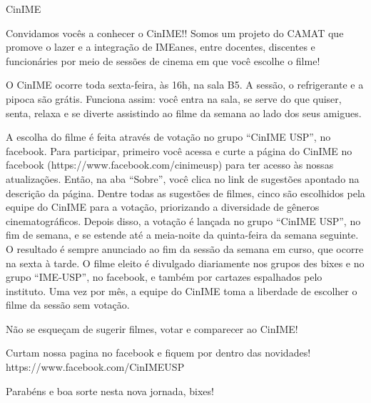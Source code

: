 \begin{subsecao}{CinIME}

Convidamos vocês a conhecer o CinIME!! Somos um projeto do CAMAT que promove o
lazer e a integração de IMEanes, entre docentes, discentes e funcionáries por
meio de sessões de cinema em que você escolhe o filme!

O CinIME ocorre toda sexta-feira, às 16h, na sala B5. A sessão, o refrigerante
e a pipoca são grátis. Funciona assim: você entra na sala, se serve do que
quiser, senta, relaxa e se diverte assistindo ao filme da semana ao lado dos
seus amigues.

A escolha do filme é feita através de votação no grupo “CinIME USP”, no
facebook. Para participar, primeiro você acessa e curte a página do CinIME no
facebook (https://www.facebook.com/cinimeusp) para ter acesso às nossas
atualizações. Então, na aba “Sobre”, você clica no link de sugestões apontado
na descrição da página. Dentre todas as sugestões de filmes, cinco são
escolhidos pela equipe do CinIME para a votação, priorizando a diversidade de
gêneros cinematográficos. Depois disso, a votação é lançada no grupo “CinIME
USP”, no fim de semana, e se estende até a meia-noite da quinta-feira da semana
seguinte. O resultado é sempre anunciado ao fim da sessão da semana em curso,
que ocorre na sexta à tarde. O filme eleito é divulgado diariamente nos grupos
des bixes e no grupo “IME-USP”, no facebook, e também por cartazes espalhados
pelo instituto. Uma vez por mês, a equipe do CinIME toma a liberdade de
escolher o filme da sessão sem votação.

Não se esqueçam de sugerir filmes, votar e comparecer ao CinIME!

Curtam nossa pagina no facebook e fiquem por dentro das novidades!
https://www.facebook.com/CinIMEUSP

Parabéns e boa sorte nesta nova jornada, bixes!

\end{subsecao}
